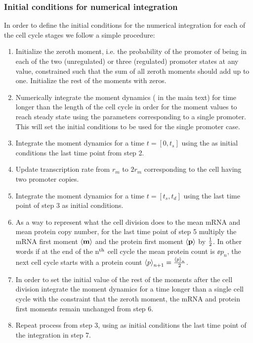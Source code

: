 \subsubsection{Initial conditions for numerical integration}

In order to define the initial conditions for the numerical integration for each
of the cell cycle stages we follow a simple procedure:
\begin{enumerate}
  \item Initialize the zeroth moment, i.e. the probability of the promoter of
  being in each of the two (unregulated) or three (regulated) promoter states at
  any value, constrained such that the sum of all zeroth moments should add up
  to one. Initialize the rest of the moments with zeros.
  \item Numerically integrate the moment dynamics ( in the
  main text) for time longer than the length of the cell cycle in order for the
  moment values to reach steady state using the parameters corresponding to a
  single promoter. This will set the initial conditions to be used for the
  single promoter case.
  \item Integrate the moment dynamics for a time $t = [0, t_s]$ using the
  as initial conditions the last time point from step 2.
  \item Update transcription rate from $r_m$ to $2 r_m$ corresponding to the
  cell having two promoter copies.
  \item Integrate the moment dynamics for a time $t = [t_s, t_d]$ using the
  last time point of step 3 as initial conditions.
  \item As a way to represent what the cell division does to the mean mRNA and
  mean protein copy number, for the last time point of step 5 multiply the mRNA
  first moment $\left\langle \mathbf{m} \right\rangle$ and the protein first moment $\left\langle \mathbf{p} \right\rangle$ by $1
  \over 2$. In other words if at the end of the n$^\text{th}$ cell cycle the mean
  protein count is $\ee{p}_n$, the next cell cycle starts with a protein count
  $\left\langle p \right\rangle_{n + 1} = {\left\langle p \right\rangle_n \over 2}$.
  \item In order to set the initial value of the rest of the moments after the
  cell division integrate the moment dynamics for a time longer than a single
  cell cycle with the constraint that the zeroth moment, the mRNA and protein
  first moments remain unchanged from step 6.
  \item Repeat process from step 3, using as initial conditions the last time
  point of the integration in step 7.
\end{enumerate}

